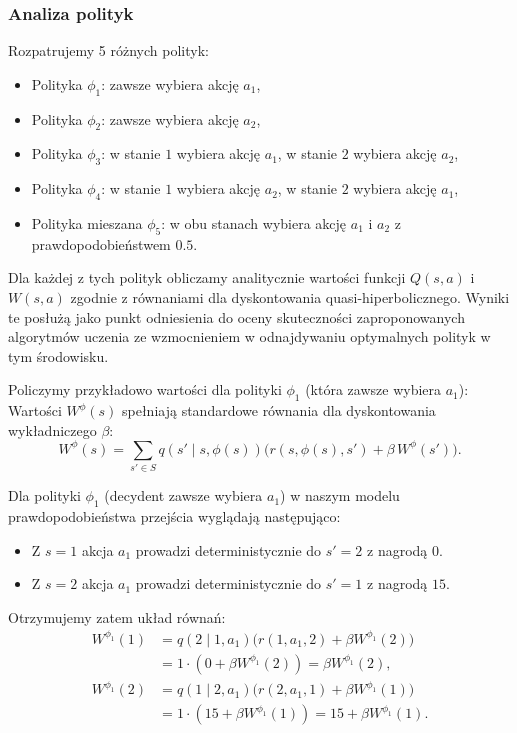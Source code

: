 \subsubsection{Analiza polityk}
Rozpatrujemy 5 różnych polityk:
\begin{itemize}
\item Polityka $\phi_1$: zawsze wybiera akcję $a_1$,
\item Polityka $\phi_2$: zawsze wybiera akcję $a_2$,
\item Polityka $\phi_3$: w stanie $1$ wybiera akcję $a_1$, w stanie $2$ wybiera akcję $a_2$,
\item Polityka $\phi_4$: w stanie $1$ wybiera akcję $a_2$, w stanie $2$ wybiera akcję $a_1$,
\item Polityka mieszana $\phi_5$: w obu stanach wybiera akcję $a_1$ i $a_2$ z prawdopodobieństwem $0.5$.
\end{itemize}
Dla każdej z tych polityk obliczamy analitycznie wartości funkcji $Q(s,a)$ i $W(s,a)$ zgodnie z równaniami dla dyskontowania quasi-hiperbolicznego. Wyniki te posłużą jako punkt odniesienia do oceny skuteczności zaproponowanych algorytmów uczenia ze wzmocnieniem w odnajdywaniu optymalnych polityk w tym środowisku.

Policzymy przykładowo wartości dla polityki $\phi_1$ (która zawsze wybiera $a_1$): \\
Wartości \(W^\phi(s)\) spełniają standardowe równania dla dyskontowania wykładniczego \(\beta\):
\[
W^\phi(s)
= \sum_{s'\in S} q(s'\mid s,\phi(s))\Big(r(s,\phi(s),s') + \beta\, W^\phi(s')\Big).
\]

Dla polityki \(\phi_1\) (decydent zawsze wybiera \(a_1\)) w naszym modelu prawdopodobieństwa przejścia wyglądają następująco:
\begin{itemize}
    \item Z $s=1$ akcja $a_1$ prowadzi deterministycznie do $s'=2$ z nagrodą $0$.
    \item Z $s=2$ akcja $a_1$ prowadzi deterministycznie do $s'=1$ z nagrodą $15$.
\end{itemize}

Otrzymujemy zatem układ równań:
\begin{align}
W^{\phi_1}(1)
&= q(2\mid 1,a_1)\big(r(1,a_1,2) + \beta W^{\phi_1}(2)\big) \nonumber \\
&= 1\cdot(0 + \beta W^{\phi_1}(2)) = \beta W^{\phi_1}(2), \label{eq:w1_phi1}\\
W^{\phi_1}(2)
&= q(1\mid 2,a_1)\big(r(2,a_1,1) + \beta W^{\phi_1}(1)\big) \nonumber \\
&= 1\cdot(15 + \beta W^{\phi_1}(1)) = 15 + \beta W^{\phi_1}(1). \label{eq:w2_phi1}
\end{align}

